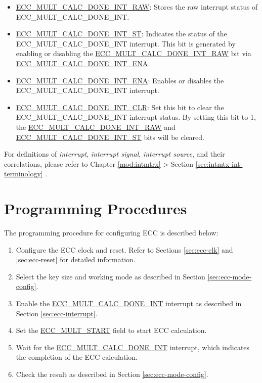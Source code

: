 \documentclass[main\_\_EN.tex]{subfiles}
\begin{document}
\begin{itemize}
    \item \hyperref[fielddesc:ECCMULTCALCDONEINTRAW]{ECC\_MULT\_CALC\_DONE\_INT\_RAW}: Stores the raw interrupt status of ECC\_MULT\_CALC\_DONE\_INT.
    \item \hyperref[fielddesc:ECCMULTCALCDONEINTST]{ECC\_MULT\_CALC\_DONE\_INT\_ST}: Indicates the status of the ECC\_MULT\_CALC\_DONE\_INT interrupt. This bit is generated by enabling or disabling the \hyperref[fielddesc:ECCMULTCALCDONEINTRAW]{ECC\_MULT\_CALC\_DONE\_INT\_RAW} bit via \hyperref[fielddesc:ECCMULTCALCDONEINTENA]{ECC\_MULT\_CALC\_DONE\_INT\_ENA}.
    \item \hyperref[fielddesc:ECCMULTCALCDONEINTENA]{ECC\_MULT\_CALC\_DONE\_INT\_ENA}: Enables or disables the ECC\_MULT\_CALC\_DONE\_INT interrupt.
    \item \hyperref[fielddesc:ECCMULTCALCDONEINTCLR]{ECC\_MULT\_CALC\_DONE\_INT\_CLR}: Set this bit to clear the ECC\_MULT\_CALC\_DONE\_INT interrupt status. By setting this bit to 1, the \hyperref[fielddesc:ECCMULTCALCDONEINTRAW]{ECC\_MULT\_CALC\_DONE\_INT\_RAW} and  \hyperref[fielddesc:ECCMULTCALCDONEINTST]{ECC\_MULT\_CALC\_DONE\_INT\_ST} bits will be cleared.
\end{itemize}

\begin{tiplisting}
For definitions of \textit{interrupt}, \textit{interrupt signal}, \textit{interrupt source}, and their correlations, please refer to Chapter \ref{mod:intmtrx} \textit{} > Section \ref{sec:intmtx-int-terminology} \textit{}.
\end{tiplisting}


\section{Programming Procedures}

The programming procedure for configuring ECC is described below:

\begin{enumerate}
    \item Configure the ECC clock and reset. Refer to Sections \ref{sec:ecc-clk} and \ref{sec:ecc-reset} for detailed information.
    \item Select the key size and working mode as described in Section \ref{sec:ecc-mode-config}.
    \item Enable the \hyperref[int:ECCMULTCALCDONEINT]{ECC\_MULT\_CALC\_DONE\_INT} interrupt as described in Section \ref{sec:ecc-interrupt}.
    \item Set the \hyperref[fielddesc:ECCMULTSTART]{ECC\_MULT\_START} field to start ECC calculation.
    \item Wait for the \hyperref[int:ECCMULTCALCDONEINT]{ECC\_MULT\_CALC\_DONE\_INT} interrupt, which indicates the completion of the ECC calculation.
    \item Check the result as described in Section \ref{sec:ecc-mode-config}.
\end{enumerate}
\end{document}
